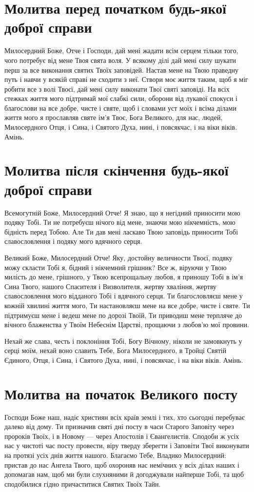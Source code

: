 \documentclass[chapters.tex]{subfiles}
\begin{document}
\section{Молитва перед початком будь-якої доброї справи}
Милосердний Боже, Отче і Господи, дай мені жадати всім серцем тільки того, чого потребує від мене Твоя свята воля. У всякому ділі дай мені силу шукати перш за все виконання святих Твоїх заповідей. Настав мене на Твою праведну путь і навчи у всякій справі не сходити з неї. Створи моє життя таким, щоб я міг робити все з волі Твоєї, дай мені силу виконати Твої святі заповіді. На всіх стежках життя мого підтримай мої слабкі сили, оборони від лукавої спокуси і благослови на все добре, чисте і святе, щоб і словами уст моїх і всіма ділами життя мого я прославляв святе ім’я Твоє, Бога Великого, для нас, людей, Милосердного Отця, і Сина, і Святого Духа, нині, і повсякчас, і на віки віків. Амінь.

\section{Молитва після скінчення будь-якої доброї справи}
Всемогутній Боже, Милосердний Отче! Я знаю, що я негідний приносити мою подяку Тобі. Ти не потребуєш нічого від мене, знаючи мою нікчемність, мою бідність перед Тобою. Але Ти дав мені ласкаво Твою заповідь приносити Тобі славословлення і подяку мого вдячного серця.

Великий Боже, Милосердний Отче! Яку, достойну величности Твоєї, подяку можу скласти Тобі я, бідний і нікчемний грішник? Все ж, віруючи у Твою милість до мене, грішного, у Твою всепрощальну любов, я приношу Тобі в ім’я Сина Твого, нашого Спасителя і Визволителя, жертву хваління, жертву славословлення мого відданого Тобі і вдячного серця. Ти благословляєш мене у кожній хвилині життя мого, Ти настановляєш мене на все добре, чисте і святе. Ти підтримуєш мене і ведеш мене по дорозі Твоїй, Ти приводиш мене терпляче до вічного блаженства у Твоїм Небеснім Царстві, прощаючи з любов’ю мої провини.

Нехай же слава, честь і поклоніння Тобі, Богу Вічному, ніколи не замовкнуть у серці моїм, нехай воно славить Тебе, Бога Милосердного, в Тройці Святій Єдиного, Отця, і Сина, і Святого Духа, нині, і повсякчас, і на віки віків. Амінь.

\section{Молитва на початок Великого посту}
Господи Боже наш, надіє християн всіх країв землі і тих, хто сьогодні перебуває далеко від дому. Ти призначив святі дні посту в часи Старого Заповіту через пророків Твоїх, і в Новому — через Апостолів і Євангелистів. Сподоби ж усіх нас у чистоті час посту провести, віру тверду зберегти і Заповіти Твої виконувати на протязі усіх днів життя нашого. Благаємо Тебе, Владико Милосердний: пристав до нас Ангела Твого, щоб охороняв нас немічних у всіх ділах наших і допомагав нам, щоб ми були слухняними й догоджували найперше Тобі, та щоб сподобилися гідно причаститися Святих Твоїх Тайн.
\end{document}
